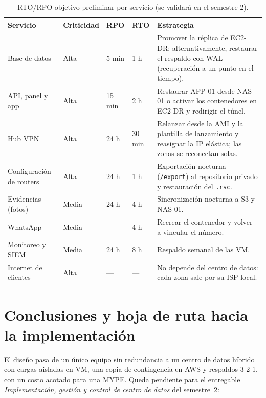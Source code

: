 \begin{table}[htbp]
\centering
\caption{RTO/RPO objetivo preliminar por servicio (se validará en el semestre 2).}
\label{tab:ce03-rto}
\small
\begin{tabularx}{\textwidth}{L{2.8cm}C{1.6cm}C{1.3cm}C{1.2cm}X}
\toprule
\textbf{Servicio} & \textbf{Criticidad} & \textbf{RPO} & \textbf{RTO} & \textbf{Estrategia} \\
\midrule
Base de datos & Alta & 5 min & 1 h & Promover la réplica de EC2-DR; alternativamente, restaurar el respaldo con WAL (recuperación a un punto en el tiempo). \\
API, panel y app & Alta & 15 min & 2 h & Restaurar APP-01 desde NAS-01 o activar los contenedores en EC2-DR y redirigir el túnel. \\
Hub VPN & Alta & 24 h & 30 min & Relanzar desde la AMI y la plantilla de lanzamiento y reasignar la IP elástica; las zonas se reconectan solas. \\
Configuración de routers & Alta & 24 h & 1 h & Exportación nocturna (\texttt{/export}) al repositorio privado y restauración del \texttt{.rsc}. \\
Evidencias (fotos) & Media & 24 h & 4 h & Sincronización nocturna a S3 y NAS-01. \\
WhatsApp & Media & --- & 4 h & Recrear el contenedor y volver a vincular el número. \\
Monitoreo y SIEM & Media & 24 h & 8 h & Respaldo semanal de las VM. \\
Internet de clientes & Alta & --- & --- & No depende del centro de datos: cada zona sale por su ISP local. \\
\bottomrule
\end{tabularx}
\end{table}

\section{Conclusiones y hoja de ruta hacia la implementación}

El diseño pasa de un único equipo sin redundancia a un centro de datos híbrido con
cargas aisladas en VM, una copia de contingencia en AWS y respaldos 3-2-1, con un
costo acotado para una MYPE. Queda pendiente para el entregable
\emph{Implementación, gestión y control de centro de datos} del semestre~2:


